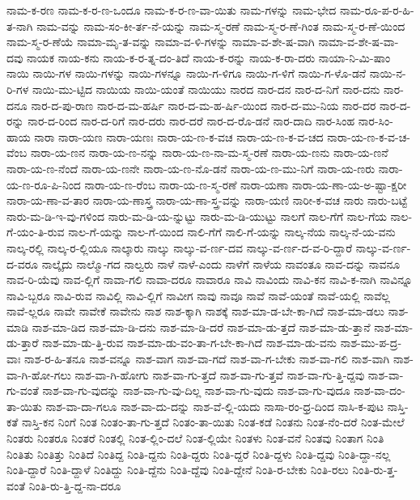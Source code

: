 {ನಾಮ-ಕ-ರಣ
ನಾಮ-ಕ-ರ-ಣ-ಒಂದೂ
ನಾಮ-ಕ-ರ-ಣ-ವಾ-ಯಿತು
ನಾಮ-ಗಳನ್ನು
ನಾಮ-ಭೇದ
ನಾಮ-ರೂ-ಪ-ರ-ಹಿ-ತ-ನಾಗಿ
ನಾಮ-ವನ್ನು
ನಾಮ-ಸಂ-ಕೀ-ರ್ತ-ನೆ-ಯನ್ನು
ನಾಮ-ಸ್ಮ-ರಣೆ
ನಾಮ-ಸ್ಮ-ರ-ಣೆ-ಗಿಂತ
ನಾಮ-ಸ್ಮ-ರ-ಣೆ-ಯಿಂದ
ನಾಮ-ಸ್ಮ-ರ-ಣೆಯೆ
ನಾಮಾ-ಮೃ-ತ-ವನ್ನು
ನಾಮಾ-ವ-ಳಿ-ಗಳನ್ನು
ನಾಮಾ-ವ-ಶೇ-ಷ-ವಾಗಿ
ನಾಮಾ-ವ-ಶೇ-ಷ-ವಾ-ದವು
ನಾಯಕ
ನಾಯ-ಕನು
ನಾಯ-ಕ-ರ-ತ್ನ-ದಂ-ತಿದೆ
ನಾಯ-ಕ-ರನ್ನು
ನಾಯ-ಕ-ರಾ-ದರು
ನಾಯಾ-ನಿ-ಮಿ-ಷಾಂ
ನಾಯಿ
ನಾಯಿ-ಗಳ
ನಾಯಿ-ಗಳನ್ನು
ನಾಯಿ-ಗಳನ್ನೂ
ನಾಯಿ-ಗ-ಳಿಗೂ
ನಾಯಿ-ಗ-ಳಿಗೆ
ನಾಯಿ-ಗ-ಳೊ-ಡನೆ
ನಾಯಿ-ನ-ರಿ-ಗಳ
ನಾಯಿ-ಮು-ಟ್ಟಿದ
ನಾಯಿಯ
ನಾಯಿ-ಯಂತೆ
ನಾಯಿಯು
ನಾರದ
ನಾರ-ದನ
ನಾರ-ದ-ನಿಗೆ
ನಾರ-ದನು
ನಾರ-ದನೂ
ನಾರ-ದ-ಪು-ರಾಣ
ನಾರ-ದ-ಮ-ಹರ್ಷಿ
ನಾರ-ದ-ಮ-ಹ-ರ್ಷಿ-ಯಿಂದ
ನಾರ-ದ-ಮು-ನಿಯ
ನಾರ-ದರ
ನಾರ-ದ-ರನ್ನು
ನಾರ-ದ-ರಿಂದ
ನಾರ-ದ-ರಿಗೆ
ನಾರ-ದರು
ನಾರ-ದರೆ
ನಾರ-ದ-ರೊ-ಡನೆ
ನಾರ-ದಾದಿ
ನಾರ-ಸಿಂಹ
ನಾರ-ಸಿಂ-ಹಾಯ
ನಾರಾ
ನಾರಾ-ಯಣ
ನಾರಾ-ಯಣಃ
ನಾರಾ-ಯ-ಣ-ಕ-ವಚ
ನಾರಾ-ಯ-ಣ-ಕ-ವ-ಚದ
ನಾರಾ-ಯ-ಣ-ಕ-ವ-ಚ-ವೆಂಬ
ನಾರಾ-ಯ-ಣನ
ನಾರಾ-ಯ-ಣ-ನನ್ನು
ನಾರಾ-ಯ-ಣ-ನಾ-ಮ-ಸ್ಮ-ರಣೆ
ನಾರಾ-ಯ-ಣನು
ನಾರಾ-ಯ-ಣನೆ
ನಾರಾ-ಯ-ಣ-ನೆಂದೆ
ನಾರಾ-ಯ-ಣನೇ
ನಾರಾ-ಯ-ಣ-ನೊ-ಡನೆ
ನಾರಾ-ಯ-ಣ-ಮು-ನಿಗೆ
ನಾರಾ-ಯ-ಣರು
ನಾರಾ-ಯ-ಣ-ರೂ-ಪಿ-ನಿಂದ
ನಾರಾ-ಯ-ಣ-ರೆಂಬ
ನಾರಾ-ಯ-ಣ-ಸ್ಮ-ರಣೆ
ನಾರಾ-ಯಣಾ
ನಾರಾ-ಯ-ಣಾ-ಯ-ಅ-ಷ್ಟಾ-ಕ್ಷರೀ
ನಾರಾ-ಯ-ಣಾ-ವ-ತಾರ
ನಾರಾ-ಯ-ಣಾಸ್ತ್ರ
ನಾರಾ-ಯ-ಣಾ-ಸ್ತ್ರ-ವನ್ನು
ನಾರಾ-ಯಣಿ
ನಾರೀ-ಕ-ವಚ
ನಾರು
ನಾರು-ಬಟ್ಟೆ
ನಾರು-ಮ-ಡಿ-ಇ-ವು-ಗಳಿಂದ
ನಾರು-ಮ-ಡಿ-ಯ-ನ್ನುಟ್ಟು
ನಾರು-ಮ-ಡಿ-ಯುಟ್ಟು
ನಾಲಗೆ
ನಾಲ-ಗೆಗೆ
ನಾಲ-ಗೆಯ
ನಾಲ-ಗೆ-ಯಂ-ತಿ-ರುವ
ನಾಲ-ಗೆ-ಯನ್ನು
ನಾಲ-ಗೆ-ಯಿಂದ
ನಾಲಿ-ಗೆಗೆ
ನಾಲಿ-ಗೆ-ಯನ್ನು
ನಾಲ್ಕ-ನೆಯ
ನಾಲ್ಕ-ನೆ-ಯ-ವನು
ನಾಲ್ಕ-ರಲ್ಲಿ
ನಾಲ್ಕ-ರ-ಲ್ಲಿಯೂ
ನಾಲ್ಕಾರು
ನಾಲ್ಕು
ನಾಲ್ಕು-ವ-ರ್ಣ-ದವ
ನಾಲ್ಕು-ವ-ರ್ಣ-ದ-ವ-ರಿ-ದ್ದಾರೆ
ನಾಲ್ಕು-ವ-ರ್ಣ-ದ-ವರೂ
ನಾಲ್ಕೈದು
ನಾಲ್ಮೊ-ಗದ
ನಾಲ್ವರು
ನಾಳೆ
ನಾಳೆ-ಎಂದು
ನಾಳೆಗೆ
ನಾಳೆಯ
ನಾವಂತೂ
ನಾವ-ದನ್ನು
ನಾವನೂ
ನಾವ-ರಿ-ಯೆವು
ನಾವ-ಲ್ಲಿಗೆ
ನಾವಾ-ಗಲಿ
ನಾವಾ-ದರೂ
ನಾವಾರೂ
ನಾವಿ
ನಾವಿಂದು
ನಾವಿ-ಕನ
ನಾವಿ-ಕ-ನಾಗಿ
ನಾವಿನ್ನೂ
ನಾವಿ-ಬ್ಬರೂ
ನಾವಿ-ರುವ
ನಾವಿಲ್ಲಿ
ನಾವಿ-ಲ್ಲಿಗೆ
ನಾವೀಗ
ನಾವು
ನಾವೂ
ನಾವೆ
ನಾವೆ-ಯಂತೆ
ನಾವೆ-ಯಲ್ಲಿ
ನಾವೆಲ್ಲ
ನಾವೆ-ಲ್ಲರೂ
ನಾವೇ
ನಾವೇಕೆ
ನಾವೇನು
ನಾಶ
ನಾಶ-ಕ್ಕಾಗಿ
ನಾಶಕ್ಕೆ
ನಾಶ-ಮಾ-ಡ-ಬೇ-ಕಾ-ಗಿದೆ
ನಾಶ-ಮಾ-ಡಲು
ನಾಶ-ಮಾಡಿ
ನಾಶ-ಮಾ-ಡಿದ
ನಾಶ-ಮಾ-ಡಿ-ದನು
ನಾಶ-ಮಾ-ಡಿ-ದರೆ
ನಾಶ-ಮಾ-ಡು-ತ್ತದೆ
ನಾಶ-ಮಾ-ಡು-ತ್ತಾನೆ
ನಾಶ-ಮಾ-ಡು-ತ್ತಾರೆ
ನಾಶ-ಮಾ-ಡು-ತ್ತಿ-ರುವ
ನಾಶ-ಮಾ-ಡು-ವಂ-ತಾ-ಗ-ಬೇ-ಕಾ-ಗಿದೆ
ನಾಶ-ಮಾ-ಡು-ವನು
ನಾಶ-ಮು-ಪ-ದ್ರ-ವಾಃ
ನಾಶ-ರ-ಹಿ-ತನೂ
ನಾಶ-ವನ್ನೂ
ನಾಶ-ವಾಗ
ನಾಶ-ವಾ-ಗದೆ
ನಾಶ-ವಾ-ಗ-ಬೇಕು
ನಾಶ-ವಾ-ಗಲಿ
ನಾಶ-ವಾಗಿ
ನಾಶ-ವಾ-ಗಿ-ಹೋ-ಗಲು
ನಾಶ-ವಾ-ಗಿ-ಹೋಗು
ನಾಶ-ವಾ-ಗು-ತ್ತದೆ
ನಾಶ-ವಾ-ಗು-ತ್ತವೆ
ನಾಶ-ವಾ-ಗು-ತ್ತಿ-ದ್ದವು
ನಾಶ-ವಾ-ಗು-ವಂತೆ
ನಾಶ-ವಾ-ಗು-ವುದನ್ನು
ನಾಶ-ವಾ-ಗು-ವು-ದಿಲ್ಲ
ನಾಶ-ವಾ-ಗು-ವುದು
ನಾಶ-ವಾ-ಗು-ವುದೂ
ನಾಶ-ವಾ-ದಂ-ತಾ-ಯಿತು
ನಾಶ-ವಾ-ದಾ-ಗಲೂ
ನಾಶ-ವಾ-ದು-ದನ್ನು
ನಾಶ-ವೆ-ಲ್ಲಿ-ಯದು
ನಾಸಾ-ರಂ-ಧ್ರ-ದಿಂದ
ನಾಸಿ-ಕ-ಪುಟ
ನಾಸ್ತಿ-ಕತೆ
ನಾಸ್ತಿ-ಕನ
ನಿಂಗೆ
ನಿಂತ
ನಿಂತಂ-ತಾ-ಗು-ತ್ತದೆ
ನಿಂತಂ-ತಾ-ಯಿತು
ನಿಂತ-ಕಡೆ
ನಿಂತನು
ನಿಂತ-ನೆಂ-ದರೆ
ನಿಂತ-ಮೇಲೆ
ನಿಂತರು
ನಿಂತರೂ
ನಿಂತರೆ
ನಿಂತಲ್ಲಿ
ನಿಂತ-ಲ್ಲಿಂ-ದಲೆ
ನಿಂತ-ಲ್ಲಿಯೇ
ನಿಂತಳು
ನಿಂತ-ವನೆ
ನಿಂತವು
ನಿಂತಾಗ
ನಿಂತಿ
ನಿಂತಿತು
ನಿಂತಿತ್ತು
ನಿಂತಿದೆ
ನಿಂತಿದ್ದ
ನಿಂತಿ-ದ್ದನು
ನಿಂತಿ-ದ್ದರು
ನಿಂತಿ-ದ್ದರೆ
ನಿಂತಿ-ದ್ದಳು
ನಿಂತಿ-ದ್ದವು
ನಿಂತಿ-ದ್ದಾ-ನಲ್ಲ
ನಿಂತಿ-ದ್ದಾರೆ
ನಿಂತಿ-ದ್ದಾಳೆ
ನಿಂತಿದ್ದು
ನಿಂತಿ-ದ್ದೆನು
ನಿಂತಿ-ದ್ದೆವು
ನಿಂತಿ-ದ್ದೇನೆ
ನಿಂತಿ-ರ-ಬೇಕು
ನಿಂತಿ-ರಲು
ನಿಂತಿ-ರು-ತ್ತ-ವಂತೆ
ನಿಂತಿ-ರು-ತ್ತಿ-ದ್ದ-ನಾ-ದರೂ
}
